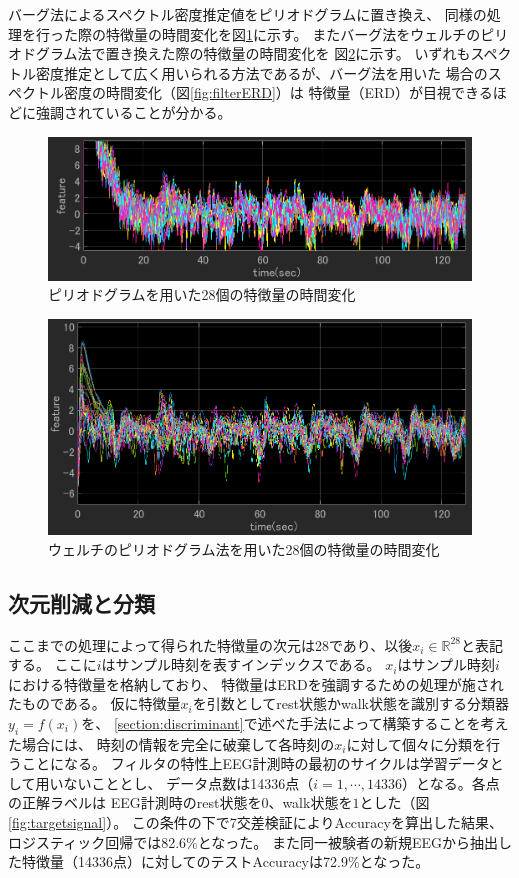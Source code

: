 バーグ法によるスペクトル密度推定値をピリオドグラムに置き換え、
同様の処理を行った際の特徴量の時間変化を図\ref{fig:fftERD}に示す。
またバーグ法をウェルチのピリオドグラム法で置き換えた際の特徴量の時間変化を
図\ref{fig:welchERD}に示す。
いずれもスペクトル密度推定として広く用いられる方法であるが、バーグ法を用いた
場合のスペクトル密度の時間変化（図\ref{fig:filterERD}）は
特徴量（ERD）が目視できるほどに強調されていることが分かる。

\begin{figure}[tp]
    \centering
    \includegraphics[width=13cm]{images/feature_sub1_fft.png}
    \caption{ピリオドグラムを用いた28個の特徴量の時間変化}
    \label{fig:fftERD}
\end{figure}
\begin{figure}[tp]
    \centering
    \includegraphics[width=13cm]{images/feature_sub1_welch.png}
    \caption{ウェルチのピリオドグラム法を用いた28個の特徴量の時間変化}
    \label{fig:welchERD}
\end{figure}

\subsection{\mc 次元削減と分類}
ここまでの処理によって得られた特徴量の次元は28であり、以後\(x_i \in \mathbb R^{28}\)と表記する。
ここに\(i\)はサンプル時刻を表すインデックスである。
\(x_i\)はサンプル時刻\(i\)における特徴量を格納しており、
特徴量はERDを強調するための処理が施されたものである。
仮に特徴量\(x_i\)を引数としてrest状態かwalk状態を識別する分類器\(y_i=f(x_i)\)を、
\ref{section:discriminant}で述べた手法によって構築することを考えた場合には、
時刻の情報を完全に破棄して各時刻の\(x_i\)に対して個々に分類を行うことになる。
フィルタの特性上EEG計測時の最初のサイクルは学習データとして用いないこととし、
データ点数は14336点（\(i=1,\cdots,14336\)）となる。各点の正解ラベルは
EEG計測時のrest状態を\(0\)、walk状態を\(1\)とした（図\ref{fig:targetsignal}）。
この条件の下で7交差検証によりAccuracyを算出した結果、
ロジスティック回帰では82.6\%となった。
また同一被験者の新規EEGから抽出した特徴量（14336点）に対してのテストAccuracyは72.9\%となった。

